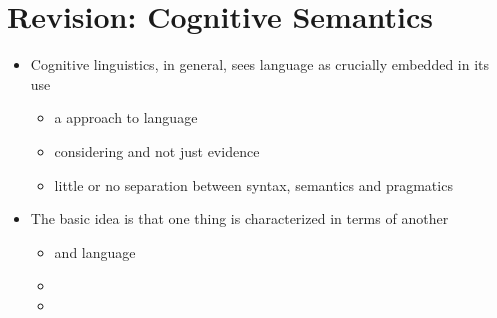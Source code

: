 \documentclass[headrule,footrule]{foils}
\begin{document}
\section{Revision: Cognitive Semantics}


\begin{itemize}
\item Cognitive linguistics, in general, sees language as crucially embedded in its use
  \begin{itemize}
  \item a  approach to language
  \item considering  and not just  evidence
  \item little or no separation between syntax, semantics and pragmatics
  \end{itemize}
\item The basic idea is that one thing is characterized in terms of another
  \begin{itemize}
  \item {} and  language
  \item {}
  \item {}
  \end{itemize}
\end{itemize}


\end{document}
